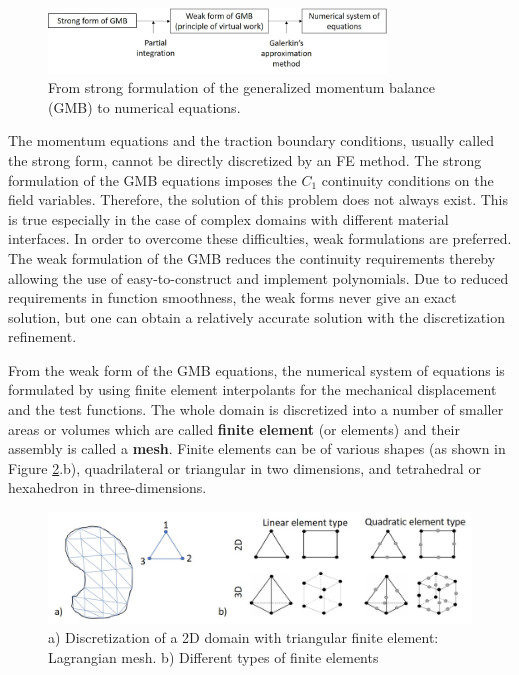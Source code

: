 \begin{figure}[!h]
\centering
\includegraphics[width=0.8\textwidth,keepaspectratio]{figures/fe_method.jpg}
\caption{From strong formulation of the generalized momentum balance (GMB) to numerical equations.}
\label{fe_method}
\end{figure}




 The momentum equations and the traction boundary conditions, usually called the strong form, cannot be directly discretized by an FE method. The strong formulation of the GMB equations imposes the $C_1$ continuity conditions on the field variables. Therefore, the solution of this problem does not always exist. This is true especially in the case of complex domains with different material interfaces. In order to overcome these difficulties, weak formulations are preferred. The weak formulation of the GMB reduces the continuity requirements thereby allowing the use of easy-to-construct and implement polynomials. Due to reduced requirements in function smoothness, the weak forms never give an exact solution, but one can obtain a relatively accurate solution with the discretization refinement.



From the weak form of the GMB equations, the numerical system of equations is formulated by using finite element interpolants for the mechanical displacement and the test functions.   The whole domain is discretized into a number of smaller areas or volumes which are called \textbf{finite element} (or elements) and their assembly is called a\textbf{ mesh}. Finite elements can be of various shapes (as shown in Figure \ref{discretization}.b),  quadrilateral or triangular in two dimensions, and tetrahedral or hexahedron in three-dimensions.


\begin{figure}[!h]
\centering
\includegraphics[width=1\textwidth,keepaspectratio]{figures/discretization.jpg} 
\caption{a) Discretization of  a 2D domain with triangular finite element: Lagrangian mesh. b) Different types of finite elements}
\label{discretization}
\end{figure}

